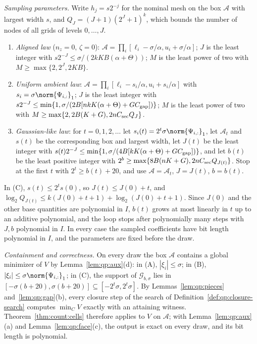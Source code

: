 \emph{Sampling parameters.} Write $h_j=s2^{-j}$ for the nominal mesh on the box
$\mathcal A$ with largest width $s$, and $Q_J=(J+1)(2^J+1)^k$, which bounds the
number of nodes of all grids of levels $0,\dots,J$.
\begin{enumerate}[label=(\Alph*)]
\item \emph{Aligned law} ($n_z=0$, $\zeta=0$): $\mathcal A=\prod_i[\ell_i-\sigma/\alpha,u_i+\sigma/\alpha]$;
 $J$ is the least integer with $s2^{-J}\le\sigma/(2kKB(\alpha+\Theta))$; $M$
 is the least power of two with $M\ge\max\{2,2^J,2KB\}$.
\item \emph{Uniform ambient law}: $\mathcal A=\prod_i[\ell_i-s_i/\alpha,u_i+s_i/\alpha]$
 with $s_i=\sigma\norm{\Psi_{i,:}}_1$; $J$ is the least integer with
 $s2^{-J}\le\min\{1,\sigma/(2B[nkK(\alpha+\Theta)+GC_{\rm gap}])\}$; $M$ is the
 least power of two with $M\ge\max\{2,2B(K+G),2nC_{\rm sec}Q_J\}$.
\item \emph{Gaussian-like law}: for $t=0,1,2,\dots$ let
 $s_i(t)=2^t\sigma\norm{\Psi_{i,:}}_1$, let $\mathcal A_t$ and $s(t)$ be the
 corresponding box and largest width, let $J(t)$ be the least integer with
 $s(t)2^{-J}\le\min\{1,\sigma/(4B[kK(\alpha+\Theta)+GC_{\rm gap}])\}$, and let
 $b(t)$ be the least positive integer with
 $2^b\ge\max\{8B(nK+G),2nC_{\rm sec}Q_{J(t)}\}$. Stop at the first $t$ with
 $2^t\ge b(t)+20$, and use $\mathcal A=\mathcal A_t$, $J=J(t)$, $b=b(t)$.
\end{enumerate}
In (C), $s(t)\le2^ts(0)$, so $J(t)\le J(0)+t$, and $\log_2Q_{J(t)}\le
k(J(0)+t+1)+\log_2(J(0)+t+1)$. Since $J(0)$ and the other base quantities are
polynomial in $I$, $b(t)$ grows at most linearly in $t$ up to an additive
polynomial, and the loop stops after polynomially many steps with $J,b$
polynomial in $I$. In every case the sampled coefficients have bit length
polynomial in $I$, and the parameters are fixed before the draw.

\emph{Containment and correctness.} On every draw the box $\mathcal A$ contains
a global minimizer of $V$ by Lemma~\ref{lem:qp:aux}(d): in (A), $|\xi_i|\le\sigma$;
in (B), $|\xi_i|\le\sigma\norm{\Psi_{i,:}}_1$; in (C), the support of
$\mathcal G_{b,\sigma}$ lies in $[-\sigma(b+20),\sigma(b+20)]\subseteq[-2^t\sigma,2^t\sigma]$.
By Lemmas~\ref{lem:qp:pieces} and~\ref{lem:qp:gap}(b), every closure step of
the search of Definition~\ref{def:qp:closure-search} computes $\min_CV$ exactly
with an attaining witness. Theorem~\ref{thm:count:cells} therefore applies to
$V$ on $\mathcal A$; with Lemma~\ref{lem:qp:aux}(a) and
Lemma~\ref{lem:qp:face}(c), the output is exact on every draw, and its bit
length is polynomial.

